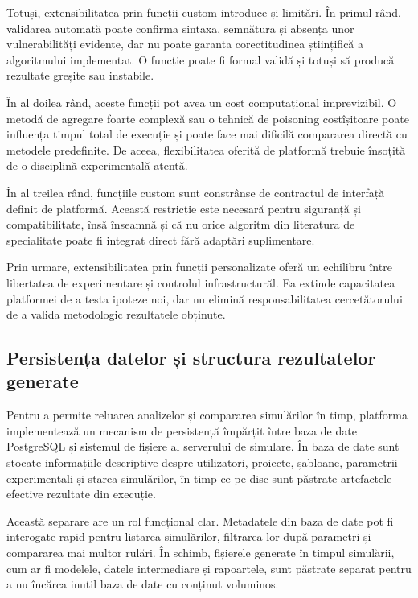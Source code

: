 \documentclass[../../main.tex]{subfiles}
\begin{document}
    Totuși, extensibilitatea prin funcții custom introduce și limitări. În primul rând, validarea automată poate confirma sintaxa, semnătura și absența unor vulnerabilități evidente, dar nu poate garanta corectitudinea științifică a algoritmului implementat. O funcție poate fi formal validă și totuși să producă rezultate greșite sau instabile.

    În al doilea rând, aceste funcții pot avea un cost computațional imprevizibil. O metodă de agregare foarte complexă sau o tehnică de poisoning costîșitoare poate influența timpul total de execuție și poate face mai dificilă compararea directă cu metodele predefinite. De aceea, flexibilitatea oferită de platformă trebuie însoțită de o disciplină experimentală atentă.

    În al treilea rând, funcțiile custom sunt constrânse de contractul de interfață definit de platformă. Această restricție este necesară pentru siguranță și compatibilitate, însă înseamnă și că nu orice algoritm din literatura de specialitate poate fi integrat direct fără adaptări suplimentare.

    Prin urmare, extensibilitatea prin funcții personalizate oferă un echilibru între libertatea de experimentare și controlul infrastructurăl. Ea extinde capacitatea platformei de a testa ipoteze noi, dar nu elimină responsabilitatea cercetătorului de a valida metodologic rezultatele obținute.

    \subsection{Persistența datelor și structura rezultatelor generate}

    Pentru a permite reluarea analizelor și compararea simulărilor în timp, platforma implementează un mecanism de persistență împărțit între baza de date PostgreSQL și sistemul de fișiere al serverului de simulare. În baza de date sunt stocate informațiile descriptive despre utilizatori, proiecte, șabloane, parametrii experimentali și starea simulărilor, în timp ce pe disc sunt păstrate artefactele efective rezultate din execuție.

    Această separare are un rol funcțional clar. Metadatele din baza de date pot fi interogate rapid pentru listarea simulărilor, filtrarea lor după parametri și compararea mai multor rulări. În schimb, fișierele generate în timpul simulării, cum ar fi modelele, datele intermediare și rapoartele, sunt păstrate separat pentru a nu încărca inutil baza de date cu conținut voluminos.
\end{document}
